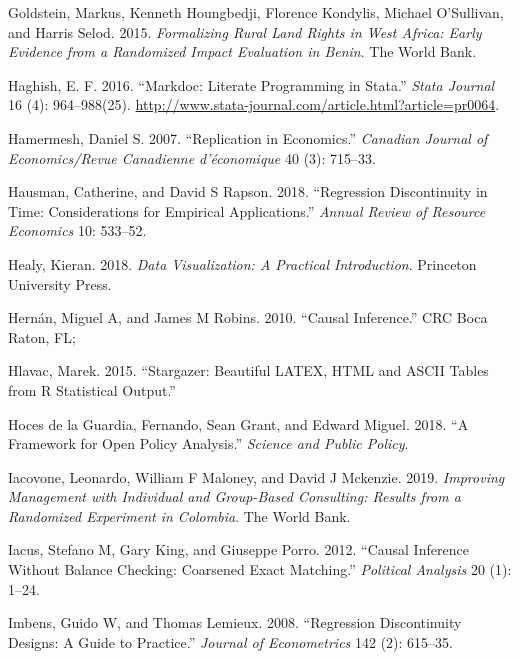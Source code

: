 \documentclass[
]{book}
\begin{document}
\leavevmode\hypertarget{ref-goldstein2015formalizing}{}%
Goldstein, Markus, Kenneth Houngbedji, Florence Kondylis, Michael O'Sullivan, and Harris Selod. 2015. \emph{Formalizing Rural Land Rights in West Africa: Early Evidence from a Randomized Impact Evaluation in Benin}. The World Bank.

\leavevmode\hypertarget{ref-pr0064}{}%
Haghish, E. F. 2016. ``Markdoc: Literate Programming in Stata.'' \emph{Stata Journal} 16 (4): 964--988(25). \url{http://www.stata-journal.com/article.html?article=pr0064}.

\leavevmode\hypertarget{ref-hamermesh2007replication}{}%
Hamermesh, Daniel S. 2007. ``Replication in Economics.'' \emph{Canadian Journal of Economics/Revue Canadienne d'économique} 40 (3): 715--33.

\leavevmode\hypertarget{ref-hausman2018regression}{}%
Hausman, Catherine, and David S Rapson. 2018. ``Regression Discontinuity in Time: Considerations for Empirical Applications.'' \emph{Annual Review of Resource Economics} 10: 533--52.

\leavevmode\hypertarget{ref-healy2018data}{}%
Healy, Kieran. 2018. \emph{Data Visualization: A Practical Introduction}. Princeton University Press.

\leavevmode\hypertarget{ref-hernan2010causal}{}%
Hernán, Miguel A, and James M Robins. 2010. ``Causal Inference.'' CRC Boca Raton, FL;

\leavevmode\hypertarget{ref-hlavac2015stargazer}{}%
Hlavac, Marek. 2015. ``Stargazer: Beautiful LATEX, HTML and ASCII Tables from R Statistical Output.''

\leavevmode\hypertarget{ref-hoces2018framework}{}%
Hoces de la Guardia, Fernando, Sean Grant, and Edward Miguel. 2018. ``A Framework for Open Policy Analysis.'' \emph{Science and Public Policy}.

\leavevmode\hypertarget{ref-iacovone2019improving}{}%
Iacovone, Leonardo, William F Maloney, and David J Mckenzie. 2019. \emph{Improving Management with Individual and Group-Based Consulting: Results from a Randomized Experiment in Colombia}. The World Bank.

\leavevmode\hypertarget{ref-iacus2012causal}{}%
Iacus, Stefano M, Gary King, and Giuseppe Porro. 2012. ``Causal Inference Without Balance Checking: Coarsened Exact Matching.'' \emph{Political Analysis} 20 (1): 1--24.

\leavevmode\hypertarget{ref-imbens2008regression}{}%
Imbens, Guido W, and Thomas Lemieux. 2008. ``Regression Discontinuity Designs: A Guide to Practice.'' \emph{Journal of Econometrics} 142 (2): 615--35.
\end{document}
